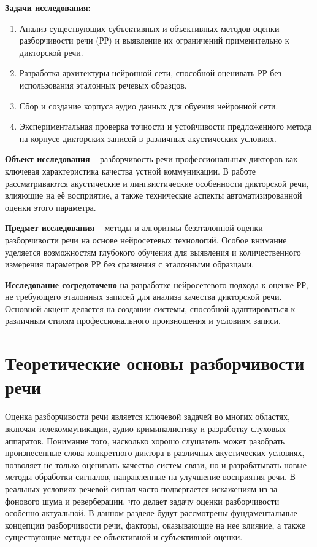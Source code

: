 \documentclass[oneside, final, 14pt]{extarticle}
\begin{document}
\textbf{Задачи исследования:}
\begin{enumerate}
\item Анализ существующих субъективных и объективных методов оценки разборчивости речи (РР) и выявление их ограничений применительно к дикторской речи.
\item Разработка архитектуры нейронной сети, способной оценивать РР без использования эталонных речевых образцов.
\item Сбор и создание корпуса аудио данных для обуения нейронной сети.
\item Экспериментальная проверка точности и устойчивости предложенного метода на корпусе дикторских записей в различных акустических условиях.
\end{enumerate}

\textbf{Объект исследования} -- разборчивость речи профессиональных дикторов как ключевая характеристика качества устной коммуникации. В работе рассматриваются акустические и лингвистические особенности дикторской речи, влияющие на её восприятие, а также технические аспекты автоматизированной оценки этого параметра.

\textbf{Предмет исследования} -- методы и алгоритмы безэталонной оценки разборчивости речи на основе нейросетевых технологий. Особое внимание уделяется возможностям глубокого обучения для выявления и количественного измерения параметров РР без сравнения с эталонными образцами.

\textbf{Исследование сосредоточено} на разработке нейросетевого подхода к оценке РР, не требующего эталонных записей для анализа качества дикторской речи. Основной акцент делается на создании системы, способной адаптироваться к различным стилям профессионального произношения и условиям записи.

\newpage

\section{Теоретические основы разборчивости речи}

Оценка разборчивости речи является ключевой задачей во многих областях, включая телекоммуникации, аудио-криминалистику и разработку слуховых аппаратов. Понимание того, насколько хорошо слушатель может разобрать произнесенные слова конкретного диктора в различных акустических условиях, позволяет не только оценивать качество систем связи, но и разрабатывать новые методы обработки сигналов, направленные на улучшение восприятия речи. В реальных условиях речевой сигнал часто подвергается искажениям из-за фонового шума и реверберации, что делает задачу оценки разборчивости особенно актуальной. В данном разделе будут рассмотрены фундаментальные концепции разборчивости речи, факторы, оказывающие на нее влияние, а также существующие методы ее объективной и субъективной оценки.
\end{document}
